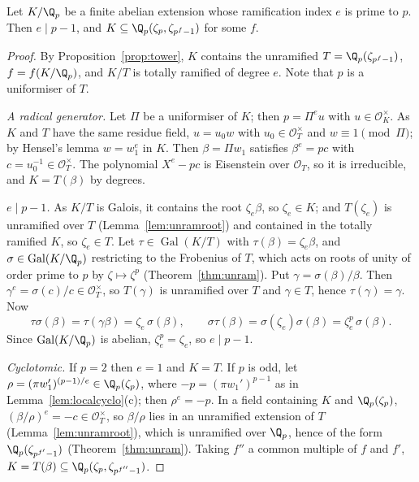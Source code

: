 \begin{lemma}\label{lem:tame}
Let $K/\Q_p$ be a finite abelian extension whose ramification index $e$ is prime to $p$. Then $e\mid p-1$, and $K\subseteq\Q_p(\zeta_p,\zeta_{p^f-1})$
for some $f$.
\end{lemma}
\begin{proof}
By Proposition~\ref{prop:tower}, $K$ contains the unramified $T=\Q_p(\zeta_{p^f-1})$, $f=f(K/\Q_p)$, and $K/T$ is totally ramified of degree
$e$. Note that $p$ is a uniformiser of $T$.

\emph{A radical generator.} Let $\Pi$ be a uniformiser of $K$; then $p=\Pi^eu$ with $u\in\mathcal O_K^\times$. As $K$ and $T$ have the same residue
field, $u=u_0w$ with $u_0\in\mathcal O_T^\times$ and $w\equiv1\pmod\Pi$; by Hensel's lemma $w=w_1^e$ in $K$. Then $\beta=\Pi w_1$ satisfies
$\beta^e=pc$ with $c=u_0^{-1}\in\mathcal O_T^\times$. The polynomial $X^e-pc$ is Eisenstein over $\mathcal O_T$, so it is irreducible, and
$K=T(\beta)$ by degrees.

\emph{$e\mid p-1$.} As $K/T$ is Galois, it contains the root $\zeta_e\beta$, so $\zeta_e\in K$; and $T(\zeta_e)$ is unramified over $T$
(Lemma~\ref{lem:unramroot}) and contained in the totally ramified $K$, so $\zeta_e\in T$. Let $\tau\in\operatorname{Gal}(K/T)$ with
$\tau(\beta)=\zeta_e\beta$, and $\sigma\in\operatorname{Gal}(K/\Q_p)$ restricting to the Frobenius of $T$, which acts on roots of unity of order
prime to $p$ by $\zeta\mapsto\zeta^p$ (Theorem~\ref{thm:unram}). Put $\gamma=\sigma(\beta)/\beta$. Then $\gamma^e=\sigma(c)/c\in\mathcal O_T^\times$, so
$T(\gamma)$ is unramified over $T$ and $\gamma\in T$, hence $\tau(\gamma)=\gamma$. Now
\[
\tau\sigma(\beta)=\tau(\gamma\beta)=\zeta_e\,\sigma(\beta),\qquad \sigma\tau(\beta)=\sigma(\zeta_e)\sigma(\beta)=\zeta_e^p\,\sigma(\beta).
\]
Since $\operatorname{Gal}(K/\Q_p)$ is abelian, $\zeta_e^p=\zeta_e$, so $e\mid p-1$.

\emph{Cyclotomic.} If $p=2$ then $e=1$ and $K=T$. If $p$ is odd, let $\rho=(\pi w_1')^{(p-1)/e}\in\Q_p(\zeta_p)$, where $-p=(\pi w_1')^{p-1}$ as in
Lemma~\ref{lem:localcyclo}(c); then $\rho^e=-p$. In a field containing $K$ and $\Q_p(\zeta_p)$, $(\beta/\rho)^e=-c\in\mathcal O_T^\times$, so $\beta/\rho$ lies in an
unramified extension of $T$ (Lemma~\ref{lem:unramroot}), which is unramified over $\Q_p$, hence of the form $\Q_p(\zeta_{p^{f'}-1})$
(Theorem~\ref{thm:unram}). Taking $f''$ a common multiple of $f$ and $f'$, $K=T(\beta)\subseteq\Q_p(\zeta_p,\zeta_{p^{f''}-1})$.
\end{proof}

